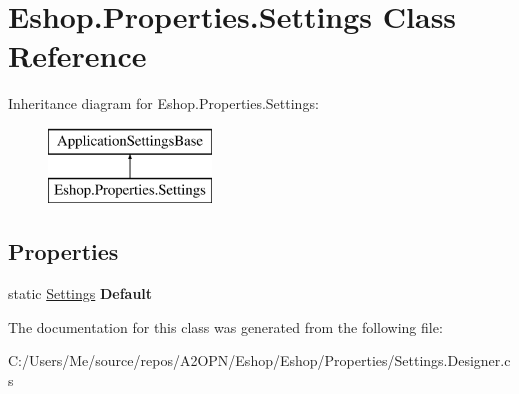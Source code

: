 \hypertarget{class_eshop_1_1_properties_1_1_settings}{}\section{Eshop.\+Properties.\+Settings Class Reference}
\label{class_eshop_1_1_properties_1_1_settings}
Inheritance diagram for Eshop.\+Properties.\+Settings\+:\begin{figure}[H]
\begin{center}
\leavevmode
\includegraphics[height=2.000000cm]{class_eshop_1_1_properties_1_1_settings}
\end{center}
\end{figure}
\subsection*{Properties}
\begin{DoxyCompactItemize}
\item 
\mbox{\label{class_eshop_1_1_properties_1_1_settings_a639d7947b44737b970771c842e65ad62}} 
static \mbox{\hyperlink{class_eshop_1_1_properties_1_1_settings}{Settings}} {\bfseries Default}
\end{DoxyCompactItemize}


The documentation for this class was generated from the following file\+:\begin{DoxyCompactItemize}
\item 
C\+:/\+Users/\+Me/source/repos/\+A2\+O\+P\+N/\+Eshop/\+Eshop/\+Properties/Settings.\+Designer.\+cs\end{DoxyCompactItemize}
